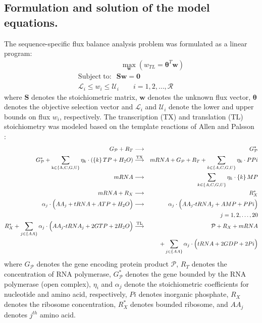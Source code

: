 \documentclass[journal=asbcd6,manuscript=article]{achemso}
\begin{document}
\subsection*{Formulation and solution of the model equations.}
The sequence-specific flux balance analysis problem was formulated as a linear program:
\begin{equation}
 \begin{multlined}
	\qquad \qquad \qquad \max_{\boldsymbol{w}}{} \! \left( w_{TL} = \mathbf{\boldsymbol{\theta}}^T \boldsymbol{w} \right) \\
	\mathrm{Subject \; to:}
	 \; \; \mathbf{S}\mathbf{w}=\mathbf{0} \\
\mathcal{L}_{i} \leq w_i \leq \mathcal{U}_{i}  \qquad i=1,2,\hdots,\mathcal{R}
 \end{multlined}
\end{equation}
where $\mathbf{S}$ denotes the stoichiometric matrix, $\mathbf{w}$ denotes the unknown flux vector, $\boldsymbol{\theta}$ denotes the objective selection vector
and $\mathcal{L}_{i}$ and $\mathcal{U}_{i}$ denote the lower and upper bounds on flux $w_{i}$, respectively.
The transcription (TX) and translation (TL) stoichiometry was modeled based on the template reactions of Allen and Palsson \cite{Allen:2003aa}:
\begin{eqnarray*}
{G}_{\mathcal{P}}+{R}_{T} &\longrightarrow& G_{\mathcal{P}}^{*} \\
G_{\mathcal{P}}^{*}+\sum_{\mathrm{k\in\left\{A,C,G,U\right\}}}\eta_{k}\cdot \left(\left\{k\right\}TP + H_{2}O\right) &\overset{\rm TX}{\longrightarrow}& mRNA+G_{\mathcal{P}}+R_{T}+ \sum_{k\in\left\{A,C,G,U\right\}} \eta_{k} \cdot PPi\\
mRNA &\longrightarrow& \sum_{k\in\left\{A,C,G,U\right\}}\eta_{k}\cdot \left\{k\right\}MP \\
mRNA+R_{X} &\longrightarrow& R_{X}^{*} \\
\alpha_{j}\cdot \Big(AA_{j}+tRNA+ATP+H_{2}O\Big) &\longrightarrow& \alpha_{j}\cdot \Big(AA_{j}\text{-}tRNA_{j} +AMP+PPi\Big)\\
&& \qquad \qquad \qquad \qquad {j=1,2,\hdots,20}\\
R_{X}^{*}+\sum_{j\in\left\{AA\right\}}\alpha_{j}\cdot \Big(AA_{j}\text{-} tRNA_{j}+2GTP+2H_{2}O\Big) &\stackrel{\rm TL}{\longrightarrow}& \mathcal{P}+R_{X}+mRNA\\
&& \quad +\sum_{j\in\left\{AA\right\}}\alpha_{j}\cdot\Big(tRNA+2GDP+2Pi\Big)
\end{eqnarray*}
where $G_{\mathcal{P}}$ denotes the gene encoding protein product $\mathcal{P}$,
$R_{T}$ denotes the concentration of RNA polymerase,
$G_{\mathcal{P}}^{*}$ denotes the gene bounded by the RNA polymerase (open complex),
$\eta_{i}$ and $ \alpha_{j}$ denote the stoichiometric coefficients for nucleotide and amino acid, respectively,
$Pi$ denotes inorganic phosphate,
$R_{X}$ denotes the ribosome concentration,
$R_{X}^{*}$ denotes bounded ribosome,
and $AA_{j}$ denotes $j^{th}$ amino acid.
\end{document}
